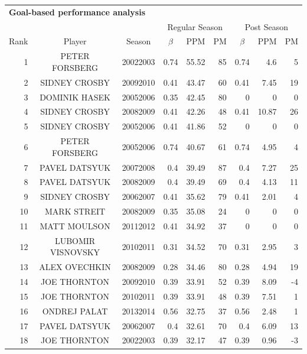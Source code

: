 \begin{table}[p]
        \centering\small
        \begin{tabular}{r c c r r r r r r }
        \multicolumn{9}{l}{\bf Goal-based performance analysis}\\
            & & & \multicolumn{3}{|c}{Regular Season} & \multicolumn{3}{|c}{Post Season}\\
            Rank & Player & Season  & \multicolumn{1}{|c}{$\beta$} & PPM & PM & \multicolumn{1}{|c}{$\beta$} & PPM & PM  \\ \hline
            \rule{0pt}{4ex} 
1&PETER FORSBERG	&	20022003	&	0.74	&	55.52	&	85	&	0.74	&	4.6	&	5	\\
2&SIDNEY CROSBY	    &	20092010	&	0.41	 &	43.47	&	60	&	0.41	&	7.45	&	19\\
3&DOMINIK HASEK	    &	20052006	&	0.35	&	42.45	&	80	&	0	    &	0	&	0\\
4&SIDNEY CROSBY	    &	20082009	&	0.41	 &	42.26	&	48	&	0.41	&	10.87	&	26\\
5&SIDNEY CROSBY	    &	20052006	&	0.41	 &	41.86	&	52	&	0	    &	0	&	0	\\
6&PETER FORSBERG	&	20052006	&	0.74	&	40.67	&	61	&	0.74	&	4.95	&	4\\
7&PAVEL DATSYUK	    &	20072008	&	0.4	     &	39.49	&	87	&	0.4	    &	7.27	&	25\\
8&PAVEL DATSYUK	    &	20082009	&	0.4	     &	39.49	&	69	&	0.4	    &	4.13	&	11\\
9&SIDNEY CROSBY	    &	20062007	&	0.41	 &	35.62	&	79	&	0.41	&	2.01	&	4\\
10&MARK STREIT	    &	20082009	&	0.35	&	35.08	&	24	&	0	    &	0	&	0	\\
11&MATT MOULSON	    &	20112012	&	0.41	 &	34.92	&	37	&	0	    &	0	&	0   \\
12&LUBOMIR VISNOVSKY&	20102011	&	0.31	&	34.52	&	70	&	0.31	&	2.95	&	3	\\
13&ALEX OVECHKIN	&	20082009	&	0.28	&	34.46	&	80	&	0.28	&	4.94	&	19	\\
14&JOE THORNTON	    &	20092010	&	0.39	 &	33.91	&	52	&	0.39	&	8.09	&	-4	\\
15&JOE THORNTON	    &	20102011	&	0.39	 &	33.91	&	48	&	0.39	&	7.51	&	1	\\
16&ONDREJ PALAT	    &	20132014	&	0.56	&	32.75	&	37	&	0.56	&	2.48	&	1	\\
17&PAVEL DATSYUK	&	20062007	&	0.4	     &	32.61	&	70	&	0.4	    &	6.09	&	13	\\
18&JOE THORNTON	    &	20022003	&	0.39	 &	32.17	&	47	&	0.39	&	0.96	&	-3	\\

\end{tabular}
\end{table}
